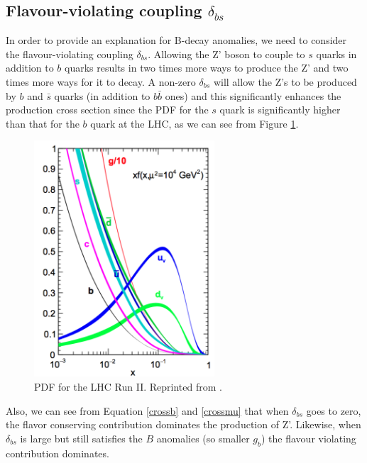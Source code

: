 \subsection{Flavour-violating coupling $\delta_{bs}$}
In order to provide an explanation for B-decay anomalies, we need to consider the flavour-violating coupling $\delta_{bs}$. Allowing the Z' boson to couple to $s$ quarks in addition to $b$ quarks results in two times more ways to produce the Z' and two times more ways for it to decay. A non-zero $\delta_{bs}$ will allow the Z's to be produced by $b$ and $\bar{s}$ quarks (in addition to $b\bar{b}$ ones) and this significantly enhances the production cross section since the PDF for the $s$ quark is significantly higher than that for the $b$ quark at the LHC, as we can see from Figure \ref{fig:pdfs}.

 \begin{figure}[H]
 	\centering
 	\includegraphics[width=0.6\textwidth]{figures/pdfs.png}
 	\singlespace
 	\caption{PDF for the LHC Run II. Reprinted from \cite{Ball:2014uwa}.}
 	\label{fig:pdfs}
 \end{figure}

Also, we can see from Equation \ref{crossb} and \ref{crossmu} that when $\delta_{bs}$ goes to zero, the flavor conserving contribution dominates the production of Z'. Likewise, when $\delta_{bs}$ is large but still satisfies the $B$ anomalies (so smaller $g_{b}$) the flavour violating contribution dominates.

